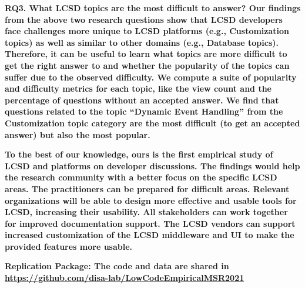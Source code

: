 \nd\bf{RQ3. What  LCSD topics are the most difficult to answer?} Our findings from the above two research questions show that  LCSD developers face challenges more unique to  LCSD platforms (e.g., Customization topics) as well as similar to other domains (e.g., Database topics). Therefore, 
it can be useful to learn what topics are more difficult to get the right answer to and whether the popularity of the topics can suffer due to the observed difficulty. We compute a suite of popularity and difficulty metrics for each topic, like the view count and the percentage of questions without an accepted answer. We find that questions related to the topic ``Dynamic Event Handling'' from the Customization topic category are the most difficult (to get an accepted answer) but also the most popular. 
    
    
\bf{To the best of our knowledge, ours is the first empirical study of  LCSD and platforms on developer discussions}. 
The findings would help
the research community with a better focus on the specific  LCSD areas. The practitioners can be prepared for difficult areas. Relevant
organizations will be able to design more effective and usable tools for LCSD, increasing their usability.  All stakeholders can work together for improved documentation support. The  LCSD vendors can support increased customization of the  LCSD middleware and UI to make the provided features more usable. 

\nd\bf{Replication Package}: The code and data are shared in \url{https://github.com/disa-lab/LowCodeEmpiricalMSR2021}
    
